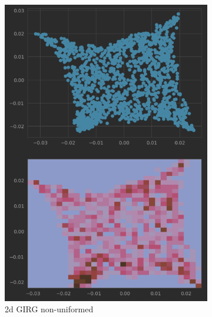 \begin{figure}
    \centering

    \begin{subfigure}{0.49\textwidth}
      \centering
      \includegraphics[width=\linewidth]{figures/diffmap_plot_nonuniformed.png}
      \caption{2d GIRG non-uniformed}
      \label{fig:sub1}
    \end{subfigure}
    \hfill
    \begin{subfigure}{0.49\textwidth}
      \centering

\end{subfigure}
\end{figure}
